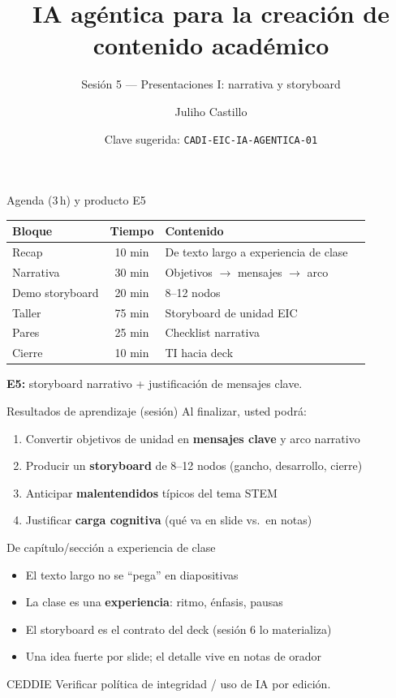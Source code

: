 \documentclass[aspectratio=169,11pt]{beamer}
\title{IA agéntica para la creación de contenido académico}
\subtitle{Sesión 5 --- Presentaciones I: narrativa y storyboard}
\author{Juliho Castillo}
\institute{CADi 40\,h · Escuela de Ingeniería y Ciencias\\
Tecnológico de Monterrey}
\date{Clave sugerida: \texttt{CADI-EIC-IA-AGENTICA-01}}
\begin{document}
\begin{frame}
\titlepage
\end{frame}

\begin{frame}{Agenda (3\,h) y producto E5}
\begin{tabularx}{\textwidth}{@{}lclX@{}}
\toprule
Bloque & Tiempo & Contenido \\
\midrule
Recap & 10 min & De texto largo a experiencia de clase \\
Narrativa & 30 min & Objetivos $\rightarrow$ mensajes $\rightarrow$ arco \\
Demo storyboard & 20 min & 8--12 nodos \\
Taller & 75 min & Storyboard de unidad EIC \\
Pares & 25 min & Checklist narrativa \\
Cierre & 10 min & TI hacia deck \\
\bottomrule
\end{tabularx}
\vspace{0.5em}
\textbf{E5:} storyboard narrativo + justificación de mensajes clave.
\end{frame}

\begin{frame}{Resultados de aprendizaje (sesión)}
Al finalizar, usted podrá:
\begin{enumerate}
\item Convertir objetivos de unidad en \textbf{mensajes clave} y arco narrativo
\item Producir un \textbf{storyboard} de 8--12 nodos (gancho, desarrollo, cierre)
\item Anticipar \textbf{malentendidos} típicos del tema STEM
\item Justificar \textbf{carga cognitiva} (qué va en slide vs.\ en notas)
\end{enumerate}
\end{frame}

\begin{frame}{De capítulo/sección a experiencia de clase}
\begin{itemize}
\item El texto largo no se ``pega'' en diapositivas
\item La clase es una \textbf{experiencia}: ritmo, énfasis, pausas
\item El storyboard es el contrato del deck (sesión 6 lo materializa)
\item Una idea fuerte por slide; el detalle vive en notas de orador
\end{itemize}
\begin{block}{CEDDIE}
Verificar política de integridad / uso de IA por edición.
\end{block}
\end{frame}
\end{document}

